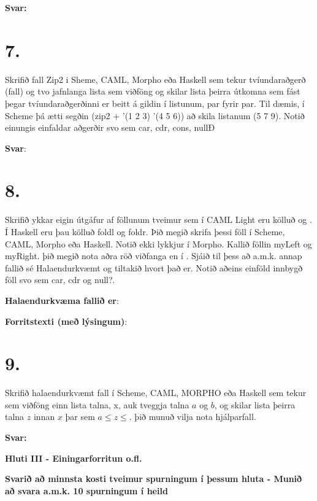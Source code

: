 \documentclass{article}
\newcommand{\sv}{\textbf{Svar:}}
\newcommand{\bo}[1]{\textbf{#1}}
\begin{document}
     \textbf{Svar:}



     \newpage 

     \section{7.}

     Skrifið fall Zip2 i Sheme, CAML, Morpho eða Haskell sem tekur 
     tvíundaraðgerð (fall) og tvo jafnlanga lista sem viðföng og skilar lista þeirra útkomna sem fást þegar tvíundaraðgerðinni er beitt á
     gildin í listunum, par fyrir par. Til dæmis, í Scheme þá ætti segðin
     (zip2 + '(1 2 3) '(4 5 6)) að skila listanum (5 7 9). Notið einungis
     einfaldar aðgerðir svo sem car, cdr, cons, nullÐ

     \textbf{Svar}:


     \newpage
     \section{8.}
     Skrifið ykkar eigin útgáfur af föllunum tveimur sem í CAML Light 
     eru kölluð  og . Í Haskell eru þau kölluð foldl og foldr. 
     Þið megið skrifa þessi föll í Scheme, CAML, Morpho eða Haskell. Notið
     ekki lykkjur í Morpho. Kallið föllin myLeft og myRight. þið megið nota aðra röð viðfanga en í . Sjáið til þess að a.m.k.
     annap fallið sé Halaendurkvæmt og tiltakið hvort það er. Notið 
     aðeins einföld innbygð föll svo sem car, cdr og null?.


     \textbf{Halaendurkvæma fallið er}:


     \textbf{Forritstexti (með lýsingum)}:


     \newpage
     \section{9.}
     Skrifið halaendurkvæmt fall í Scheme, CAML, MORPHO eða Haskell
     sem tekur sem viðföng einn lista talna, x, auk tveggja talna $a$ og $b$,
     og skilar lista þeirra talna $z$ innan $x$ þar sem $a \leq z \leq$. þið munuð 
     vilja nota hjálparfall.


     \sv 




     \newpage

     \begin{center}
     \bo{Hluti III - Einingarforritun o.fl.}

     \bo{Svarið að minnsta kosti tveimur spurningum í þessum hluta - Munið að svara a.m.k. 10 spurningum í heild}
     \end{center}
\end{document}
